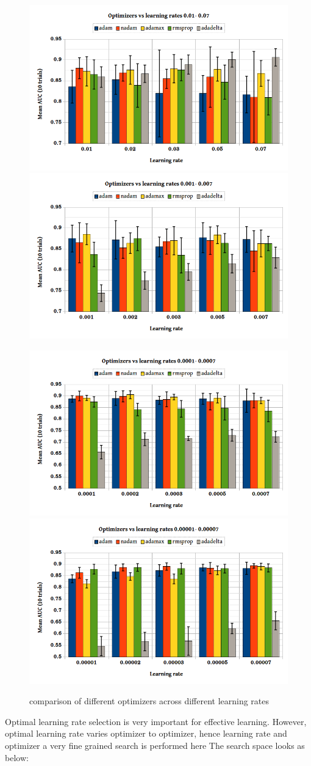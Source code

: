 \begin{figure}[htp]
\centering
\includegraphics[width=.4\textwidth]{images/densenet/first_compare_lr_opt}\quad
\includegraphics[width=.4\textwidth]{images/densenet/second_compare_lr_opt}

\medskip
\includegraphics[width=.4\textwidth]{images/densenet/third_compare_lr_opt}\quad
\includegraphics[width=.4\textwidth]{images/densenet/fourth_compare_lr_opt}

\caption{comparison of different optimizers across different learning rates}
\label{pics:lr_optimizers_compare}
\end{figure}
Optimal learning rate selection is very important for effective learning. However, optimal learning rate varies optimizer to optimizer, hence learning rate and optimizer a very fine grained search is performed here
The search space looks as below:
